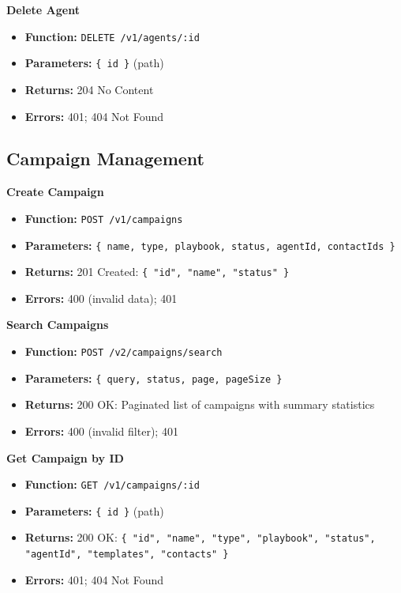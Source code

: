 \documentclass[a4paper]{article}
\begin{document}
\textbf{Delete Agent}
\begin{itemize}
  \item \textbf{Function:} \texttt{DELETE /v1/agents/:id}
  \item \textbf{Parameters:} \texttt{\{ id \}} (path)
  \item \textbf{Returns:} 204 No Content
  \item \textbf{Errors:} 401; 404 Not Found
\end{itemize}

\subsection{Campaign Management}

\textbf{Create Campaign}
\begin{itemize}
  \item \textbf{Function:} \texttt{POST /v1/campaigns}
  \item \textbf{Parameters:} \texttt{\{ name, type, playbook, status, agentId, contactIds \}}
  \item \textbf{Returns:} 201 Created: \texttt{\{ "id", "name", "status" \}}
  \item \textbf{Errors:} 400 (invalid data); 401
\end{itemize}

\textbf{Search Campaigns}
\begin{itemize}
  \item \textbf{Function:} \texttt{POST /v2/campaigns/search}
  \item \textbf{Parameters:} \texttt{\{ query, status, page, pageSize \}}
  \item \textbf{Returns:} 200 OK: Paginated list of campaigns with summary statistics
  \item \textbf{Errors:} 400 (invalid filter); 401
\end{itemize}

\textbf{Get Campaign by ID}
\begin{itemize}
  \item \textbf{Function:} \texttt{GET /v1/campaigns/:id}
  \item \textbf{Parameters:} \texttt{\{ id \}} (path)
  \item \textbf{Returns:} 200 OK: \texttt{\{ "id", "name", "type", "playbook", "status", "agentId", "templates", "contacts" \}}
  \item \textbf{Errors:} 401; 404 Not Found
\end{itemize}
\end{document}
